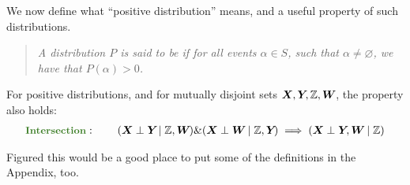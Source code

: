 \documentclass[11pt]{article}
\begin{document}
We now define what ``positive distribution'' means, and a useful property of such distributions.
\vspace{-0.5em}
\begin{quote}
{\footnotesize\itshape
	A distribution $P$ is said to be  if for all events $\alpha \in S$, such that $\alpha \ne \varnothing$, we have that $P(\alpha) > 0$. 	
}
\end{quote}
For positive distributions, and for mutually disjoint sets $\bm{X}_{}, \bm{Y}_{}, \mathbb{Z}, \bm{W}_{}$, the  property also holds:
\begin{align}
	\mtgreen{Intersection}:\qquad (\X \perp \Y \mid \Z, \matr W) \& (\X \perp \matr W \mid \Z, \Y) \implies (\X \perp \Y, \matr W \mid \Z)
\end{align}


\myspace
{}
\myspace

Figured this would be a good place to put some of the definitions in the Appendix, too. \\
\end{document}
